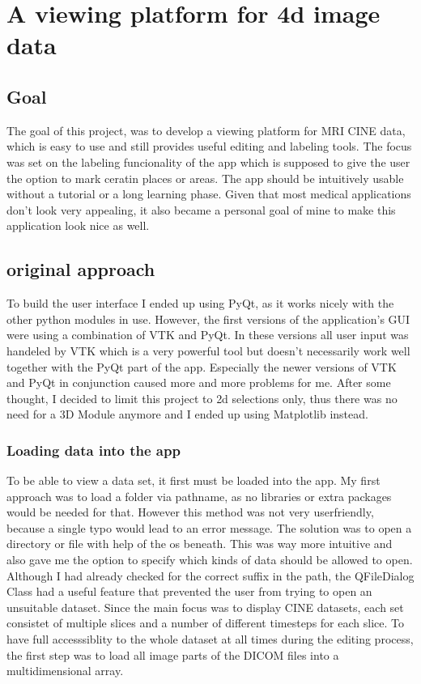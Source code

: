 
\chapter{A viewing platform for 4d image data}
  \label{A viewing platform for 4d image data}
  \section{Goal}
  The goal of this project, was to develop a viewing platform for MRI CINE data, which is easy to use and still provides useful editing and labeling tools. The focus was set on the labeling funcionality of the app which is supposed to give the user the option to mark ceratin places or areas. The app should be intuitively usable without a tutorial or a long learning phase. Given that most medical applications don't look very appealing, it also became a personal goal of mine to make this application look nice as well.

\section{original approach}
\label{original approach}
To build the user interface I ended up using PyQt, as it works nicely with the other python modules in use. However, the first versions of the application's GUI were using a combination of VTK and PyQt. In these versions all user input was handeled by VTK which is a very powerful tool but doesn't necessarily work well together with the PyQt part of the app. Especially the newer versions of VTK and PyQt in conjunction caused more and more problems for me. After some thought, I decided to limit this project to 2d selections only, thus there was no need for a 3D Module anymore and I ended up using Matplotlib instead.


\subsection{Loading data into the app}
\label{Loading data into the app}
To be able to view a data set, it first must be loaded into the app. My first approach was to load a folder via pathname, as no libraries or extra packages would be needed for that. However this method was not very userfriendly, because a single typo would lead to an error message. The solution was to open a directory or file with help of the os beneath. This was way more intuitive and also gave me the option to specify which kinds of data should be allowed to open. Although I had already checked for the correct suffix in the path, the QFileDialog Class had a useful feature that prevented the user from trying to open an unsuitable dataset.
Since the main focus was to display CINE datasets, each set consistet of multiple slices and a number of different timesteps for each slice. To have full accesssiblity to the whole dataset at all times during the editing process, the first step was to load all image parts of the DICOM files into a multidimensional array.


